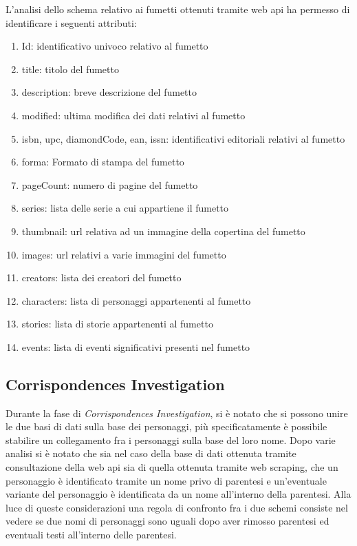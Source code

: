 \documentclass[
12pt, %
a4paper, %
oneside, %
headinclude,footinclude, %
BCOR5mm, %
]{scrartcl}
\begin{document}
L'analisi dello schema relativo ai fumetti ottenuti tramite web api ha permesso di identificare i seguenti attributi:
\begin{enumerate}
	\item Id: identificativo univoco relativo al fumetto
	\item title: titolo del fumetto
	\item description: breve descrizione del fumetto
	\item modified: ultima modifica dei dati relativi al fumetto
	\item isbn, upc, diamondCode, ean, issn: identificativi editoriali relativi al fumetto
	\item forma: Formato di stampa del fumetto
	\item pageCount: numero di pagine del fumetto
	\item series: lista delle serie a cui appartiene il fumetto
	\item thumbnail: url relativa ad un immagine della copertina del fumetto
	\item images: url relativi a varie immagini del fumetto
	\item creators: lista dei creatori del fumetto
	\item characters: lista di personaggi appartenenti al fumetto
	\item stories: lista di storie appartenenti al fumetto
	\item events: lista di eventi significativi presenti nel fumetto
\end{enumerate}
\subsection{Corrispondences Investigation}
Durante la fase di \textit{Corrispondences Investigation}, si è notato che si possono unire le due basi di dati sulla base dei personaggi, più specificatamente è possibile stabilire un collegamento fra i personaggi sulla base del loro nome. Dopo varie analisi si è notato che sia nel caso della base di dati ottenuta tramite consultazione della web api sia di quella ottenuta tramite web scraping, che un personaggio è identificato tramite un nome privo di parentesi e un'eventuale variante del personaggio è identificata da un nome all'interno della parentesi. Alla luce di queste considerazioni una regola di confronto fra i due schemi consiste nel vedere se due nomi di personaggi sono uguali dopo aver rimosso parentesi ed eventuali testi all'interno delle parentesi.
\end{document}
